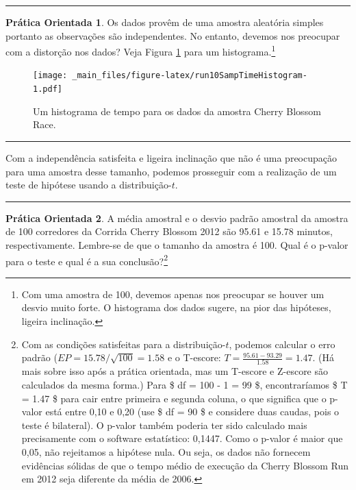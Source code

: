 \documentclass[
]{book}
\theoremstyle{definition}
\theoremstyle{definition}
\theoremstyle{definition}
\newtheorem{exercise}{Prática Orientada}[chapter]
\theoremstyle{definition}
\theoremstyle{remark}
\begin{document}
\begin{center}\rule{0.5\linewidth}{0.5pt}\end{center}

\begin{exercise}
\protect\hypertarget{exr:unnamed-chunk-195}{}{\label{exr:unnamed-chunk-195} }Os dados provêm de uma amostra aleatória simples portanto as observações são independentes. No entanto, devemos nos preocupar com a distorção nos dados? Veja Figura \ref{fig:run10SampTimeHistogram} para um histograma.\footnote{Com uma amostra de 100, devemos apenas nos preocupar se houver um desvio muito forte. O histograma dos dados sugere, na pior das hipóteses, ligeira inclinação.}
\end{exercise}

\begin{figure}
\centering
\texttt{[image: \_main\_files/figure-latex/run10SampTimeHistogram-1.pdf]}
\caption{\label{fig:run10SampTimeHistogram}Um histograma de tempo para os dados da amostra Cherry Blossom Race.}
\end{figure}

\begin{center}\rule{0.5\linewidth}{0.5pt}\end{center}

Com a independência satisfeita e ligeira inclinação que não é uma preocupação para uma amostra desse tamanho, podemos prosseguir com a realização de um teste de hipótese usando a distribuição-\(t\).

\begin{center}\rule{0.5\linewidth}{0.5pt}\end{center}

\begin{exercise}
\protect\hypertarget{exr:unnamed-chunk-196}{}{\label{exr:unnamed-chunk-196} }A média amostral e o desvio padrão amostral da amostra de 100 corredores da Corrida Cherry Blossom 2012 são 95.61 e 15.78 minutos, respectivamente. Lembre-se de que o tamanho da amostra é 100. Qual é o p-valor para o teste e qual é a sua conclusão?\footnote{Com as condições satisfeitas para a distribuição-\(t\), podemos calcular o erro padrão (\(EP = 15.78 / \sqrt{100} = 1.58\) e o T-escore: \(T = \frac{95.61 - 93.29}{1.58} = 1.47\). (Há mais sobre isso após a prática orientada, mas um T-escore e Z-escore são calculados da mesma forma.) Para \$ df = 100 - 1 = 99 \$, encontraríamos \$ T = 1.47 \$ para cair entre primeira e segunda coluna, o que significa que o p-valor está entre 0,10 e 0,20 (use \$ df = 90 \$ e considere duas caudas, pois o teste é bilateral). O p-valor também poderia ter sido calculado mais precisamente com o software estatístico: 0,1447. Como o p-valor é maior que 0,05, não rejeitamos a hipótese nula. Ou seja, os dados não fornecem evidências sólidas de que o tempo médio de execução da Cherry Blossom Run em 2012 seja diferente da média de 2006.}
\end{exercise}
\end{document}
